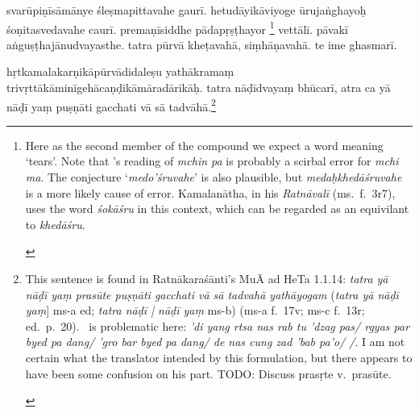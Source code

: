 \documentclass[naipra.tex]{subfiles}
\begin{document}
\begin{sanskrit}
\pstart
svarūpiṇīsāmānye  śleṣmapittavahe gaurī. 
hetudāyikāviyoge ūrujaṅghayoḥ śoṇitasvedavahe caurī. 
premaṇīsiddhe pādapṛṣṭhayor \footnote{\begin{english}
	Here as the second member of the compound we expect a word meaning `tears'.
	Note that \TIB 's reading of \emph{mchin pa} is probably a scirbal error for \emph{mchi ma}.
	The conjecture `\emph{medo'śruvahe}' is also plausible, but \emph{medaḥkhedāśruvahe} is a more likely cause of error. 
	Kamalanātha, in his \emph{Ratnāvalī} (ms.\ f.\ 3r7), uses the word \emph{śokāśru} in this context, which can be regarded as an equivilant to \emph{khedāśru}.
\end{english}} vettālī. 
pāvakī aṅguṣṭhajānudvayasthe.
tatra pūrvā kheṭavahā,  siṃhāṇavahā.
te ime ghasmarī. 
\pend


\pstart
hṛtkamalakarṇikāpūrvādidaleṣu yathākramaṃ trivṛttā\dsh kāminī\dsh gehā\dsh caṇḍikā\dsh māradārikāḥ. 
tatra  nāḍīdvayaṃ bhūcarī, 
atra ca yā nāḍī yaṃ  puṣṇāti gacchati vā sā tadvāhā.\footnote{\begin{english}
	This sentence is found in Ratnākaraśānti's MuĀ ad HeTa 1.1.14: \emph{tatra yā nāḍī yaṃ prasūte puṣṇāti gacchati vā sā tadvahā yathāyogam} (\emph{tatra yā nāḍī yaṃ}] ms-a ed; \emph{tatra nāḍī | nāḍī yaṃ} ms-b) (ms-a f.\ 17v; ms-c f.\ 13r; ed.\ p.\ 20).
	\TIB\ is problematic here: \emph{'di yang rtsa nas rab tu 'dzag pas/ rgyas par byed pa dang/ 'gro bar byed pa dang/ de nas cung zad 'bab pa'o/ /}.
	I am not certain what the translator intended by this formulation, but there appears to have been some confusion on his part.
	TODO: Discuss prasṛte v.\ prasūte.
\end{english}} 
\pend


\end{sanskrit}
\end{document}
